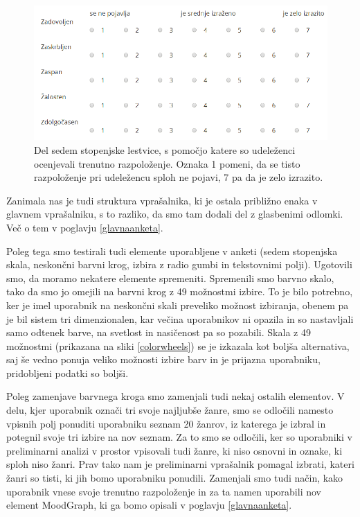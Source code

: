 \documentclass[a4paper, 12pt]{book}
\begin{document}
{\begin{figure}[ht]
\centering
\includegraphics[width=13cm]{images/likart.png}

\caption{Del sedem stopenjske lestvice, s pomočjo katere so udeleženci ocenjevali trenutno razpoloženje. Oznaka 1 pomeni, da se tisto razpoloženje pri udeležencu sploh ne pojavi, 7 pa da je zelo izrazito. }
\label{skala}
\end{figure}

Zanimala nas je tudi struktura vprašalnika, ki je ostala približno enaka v glavnem vprašalniku, s to razliko, da smo tam dodali del z glasbenimi odlomki. Več o tem v poglavju \ref{glavnaanketa}.

Poleg tega smo testirali tudi elemente uporabljene v anketi (sedem stopenjska skala, neskončni barvni krog, izbira z radio gumbi in tekstovnimi polji). Ugotovili smo, da moramo nekatere elemente spremeniti. Spremenili smo barvno skalo, tako da smo jo omejili na barvni krog z 49 možnostmi izbire. To je bilo potrebno, ker je imel uporabnik na neskončni skali preveliko možnost izbiranja, obenem pa je bil sistem tri dimenzionalen, kar večina uporabnikov ni opazila in so nastavljali samo odtenek barve, na svetlost in nasičenost pa so pozabili. Skala z 49 možnostmi (prikazana na sliki \ref{colorwheels}) se je izkazala kot boljša alternativa, saj še vedno ponuja veliko možnosti izbire barv in je prijazna uporabniku, pridobljeni podatki so boljši.

Poleg zamenjave barvnega kroga smo zamenjali tudi nekaj ostalih elementov. V delu, kjer uporabnik označi tri svoje najljubše žanre, smo se odločili namesto vpisnih polj ponuditi uporabniku seznam 20 žanrov, iz katerega je izbral in potegnil svoje tri izbire na nov seznam.  Za to smo se odločili, ker so uporabniki v preliminarni analizi v prostor vpisovali tudi žanre, ki niso osnovni in oznake, ki sploh niso žanri. Prav tako nam je preliminarni vprašalnik pomagal izbrati, kateri žanri so tisti, ki jih bomo uporabniku ponudili. Zamenjali smo tudi način, kako uporabnik vnese svoje trenutno razpoloženje in za ta namen uporabili nov element MoodGraph, ki ga bomo opisali v poglavju \ref{glavnaanketa}. 

}
\end{document}
